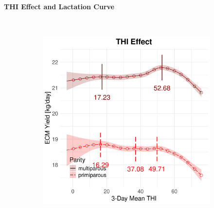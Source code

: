 \newpage
\paragraph{THI Effect and Lactation Curve} \quad \\
\begin{figure}[H]
    \centering
    \begin{subfigure}[b]{0.45\textwidth}
        \centering
        \includegraphics[width=\textwidth]{thesis/figures/models/ecm/full/ob_ecm_full/ob_ecm_full_marginal_thi_milk_combined.png}
    \end{subfigure}
    \hspace{0.05\textwidth} %
    \begin{subfigure}[b]{0.45\textwidth}
        \centering

\end{subfigure}
\end{figure}
